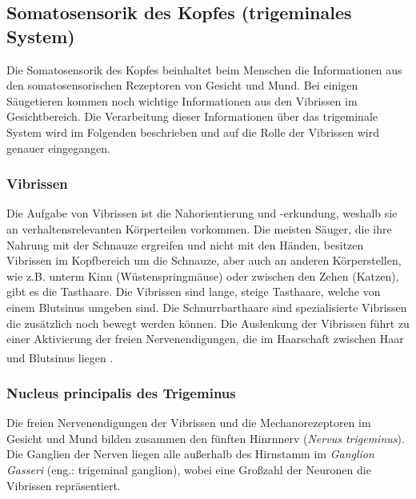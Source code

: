\documentclass[12pt,a4paper,pdftex]{article}
\begin{document}
\newpage
\subsection{Somatosensorik des Kopfes (trigeminales System)}
\label{sec:somatokopf}
Die Somatosensorik des Kopfes beinhaltet beim Menschen die Informationen aus den somatosensorischen Rezeptoren von Gesicht und Mund. Bei einigen Säugetieren kommen noch wichtige Informationen aus den Vibrissen im Gesichtbereich. Die Verarbeitung dieser Informationen über das trigeminale System wird im Folgenden beschrieben und auf die Rolle der Vibrissen wird genauer eingegangen.

\subsubsection*{Vibrissen}
Die Aufgabe von Vibrissen ist die Nahorientierung und -erkundung, weshalb sie an verhaltensrelevanten Körperteilen vorkommen. Die meisten Säuger, die ihre Nahrung mit der Schnauze ergreifen und nicht mit den Händen, besitzen Vibrissen im Kopfbereich um die Schnauze, aber auch an anderen Körperstellen, wie z.B. unterm Kinn (Wüstenspringmäuse) oder zwischen den Zehen (Katzen), gibt es die Tasthaare. Die Vibrissen sind lange, steige Tasthaare, welche von einem Blutsinus umgeben sind. Die Schnurrbarthaare sind spezialisierte Vibrissen die zusätzlich noch bewegt werden können. 
Die Auslenkung der Vibrissen führt zu einer Aktivierung der freien Nervenendigungen, die im Haarschaft zwischen Haar und Blutsinus liegen \textsuperscript{\cite[5]{heldmaier2003tierphysiologie}}.

\subsubsection{Nucleus principalis des Trigeminus}
Die freien Nervenendigungen der Vibrissen und die Mechanorezeptoren im Gesicht und Mund bilden zusammen den fünften Hinrnnerv (\textit{Nervus trigeminus}). Die Ganglien der Nerven liegen alle außerhalb des Hirnstamm im \textit{Ganglion Gasseri} (eng.: trigeminal ganglion), wobei eine Großzahl der Neuronen die Vibrissen repräsentiert. 
\end{document}
